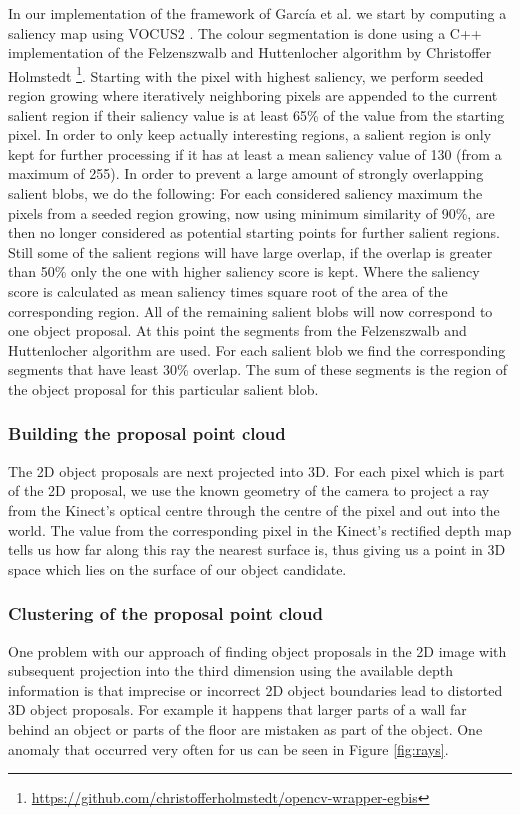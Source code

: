 \documentclass[a4paper,11pt,english]{article}
\begin{document}
In our implementation of the framework of García et al. we start by computing a saliency map using VOCUS2 \cite{frintrop2015traditional}.
The colour segmentation is done using a C++ implementation of the Felzenszwalb and Huttenlocher algorithm \cite{felzenszwalb2004efficient} by Christoffer Holmstedt \footnote{\url{https://github.com/christofferholmstedt/opencv-wrapper-egbis}}.
Starting with the pixel with highest saliency, we perform seeded region growing where iteratively neighboring pixels are appended to the current salient region if their saliency value is at least 65\% of the value from the starting pixel.
In order to only keep actually interesting regions, a salient region is only kept for further processing if it has at least a mean saliency value of 130 (from a maximum of 255).
In order to prevent a large amount of strongly overlapping salient blobs, we do the following: For each considered saliency maximum the pixels from a seeded region growing, now using minimum similarity of 90\%, are then no longer considered as potential starting points for further salient regions.
Still some  of the salient regions will have large overlap, if the overlap is greater than 50\% only the one with higher saliency score is kept.
Where the saliency score is calculated as mean saliency times square root of the area of the corresponding region.
All of the remaining salient blobs will now correspond to one object proposal.
At this point the segments from the Felzenszwalb and Huttenlocher algorithm are used.
For each salient blob we find the corresponding segments that have least 30\% overlap.
The sum of these segments is the region of the object proposal for this particular salient blob.

\subsubsection{Building the proposal point cloud}
\label{sssec:building_proposal_point_cloud}

The 2D object proposals are next projected into 3D.
For each pixel which is part of the 2D proposal, we use the known geometry of the camera to project a ray from the Kinect's optical centre through the centre of the pixel and out into the world.
The value from the corresponding pixel in the Kinect's rectified depth map tells us how far along this ray the nearest surface is, thus giving us a point in 3D space which lies on the surface of our object candidate.

\subsubsection{Clustering of the proposal point cloud}
One problem with our approach of finding object proposals in the 2D image with subsequent projection into the third dimension using the available depth information is that imprecise or incorrect 2D object boundaries lead to distorted 3D object proposals.
For example it happens that larger parts of a wall far behind an object or parts of the floor are mistaken as part of the object.
One anomaly that occurred very often for us can be seen in Figure  \ref{fig:rays}.
\end{document}

